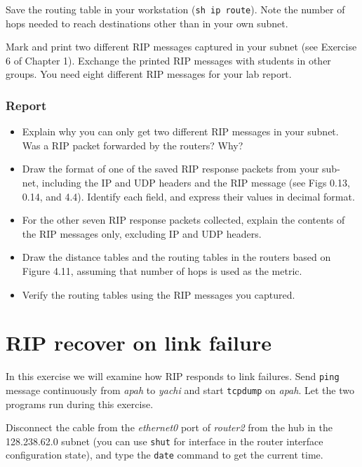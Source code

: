 \documentclass{../UTNetLab}
\begin{document}
    Save the routing table in your workstation (\lstinline{sh ip route}).
    Note the number of hops needed to reach destinations other than in your own subnet.

    Mark and print two different RIP messages captured in your subnet (see Exercise 6 of Chapter 1).
    Exchange the printed RIP messages with students in other groups.
    You need eight different RIP messages for your lab report.
    
    \subsubsection*{Report}
    \begin{itemize}
        \item Explain why you can only get two different RIP messages in your subnet.
        Was a RIP packet forwarded by the routers?
        Why?
        \item Draw the format of one of the saved RIP response packets from your sub- net, including the IP and UDP headers and the RIP message (see Figs 0.13, 0.14, and 4.4). Identify each field, and express their values in decimal format.
        \item For the other seven RIP response packets collected, explain the contents of the RIP messages only, excluding IP and UDP headers.
    \end{itemize}
    \begin{itemize}
        \item Draw the distance tables and the routing tables in the routers based on Figure 4.11, assuming that number of hops is used as the metric.
        \item Verify the routing tables using the RIP messages you captured.
    \end{itemize}


\section{RIP recover on link failure}
    In this exercise we will examine how RIP responds to link failures.
    Send \lstinline{ping} message continuously from \textit{apah} to \textit{yachi} and start \lstinline{tcpdump} on \textit{apah}.
    Let the two programs run during this exercise.

    Disconnect the cable from the \textit{ethernet0} port of \textit{router2} from the hub in the 128.238.62.0 subnet (you can use \lstinline[language={cisco}]{shut} for interface in the router interface configuration state), and type the \lstinline{date} command to get the current time.
\end{document}
